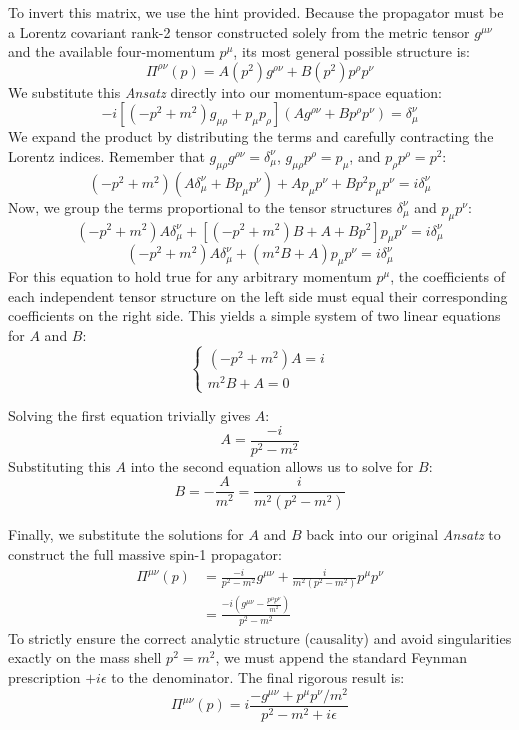 To invert this matrix, we use the hint provided. Because the propagator must be a Lorentz covariant rank-2 tensor constructed solely from the metric tensor $g^{\mu\nu}$ and the available four-momentum $p^\mu$, its most general possible structure is:
\[
    \Pi^{\rho\nu}(p) = A(p^2) g^{\rho\nu} + B(p^2) p^\rho p^\nu
\]
We substitute this \textit{Ansatz} directly into our momentum-space equation:
\[
    -i \left[ (-p^2 + m^2)g_{\mu\rho} + p_\mu p_\rho \right] \left( A g^{\rho\nu} + B p^\rho p^\nu \right) = \delta_\mu^\nu
\]
We expand the product by distributing the terms and carefully contracting the Lorentz indices. Remember that $g_{\mu\rho} g^{\rho\nu} = \delta_\mu^\nu$, $g_{\mu\rho} p^\rho = p_\mu$, and $p_\rho p^\rho = p^2$:
\[
    (-p^2 + m^2)(A \delta_\mu^\nu + B p_\mu p^\nu) + A p_\mu p^\nu + B p^2 p_\mu p^\nu = i \delta_\mu^\nu
\]
Now, we group the terms proportional to the tensor structures $\delta_\mu^\nu$ and $p_\mu p^\nu$:
\[
    (-p^2 + m^2)A \delta_\mu^\nu + \left[ (-p^2 + m^2)B + A + B p^2 \right] p_\mu p^\nu = i \delta_\mu^\nu
\]
\[
    (-p^2 + m^2)A \delta_\mu^\nu + \left( m^2 B + A \right) p_\mu p^\nu = i \delta_\mu^\nu
\]
For this equation to hold true for any arbitrary momentum $p^\mu$, the coefficients of each independent tensor structure on the left side must equal their corresponding coefficients on the right side. This yields a simple system of two linear equations for $A$ and $B$:
\[
    \begin{cases}
        (-p^2 + m^2)A = i \\
        m^2 B + A = 0
    \end{cases}
\]

Solving the first equation trivially gives $A$:
\[
    A = \frac{-i}{p^2 - m^2}
\]
Substituting this $A$ into the second equation allows us to solve for $B$:
\[
    B = -\frac{A}{m^2} = \frac{i}{m^2 (p^2 - m^2)}
\]

Finally, we substitute the solutions for $A$ and $B$ back into our original \textit{Ansatz} to construct the full massive spin-1 propagator:
\[
    \begin{aligned}
        \Pi^{\mu\nu}(p) & = \frac{-i}{p^2 - m^2} g^{\mu\nu} + \frac{i}{m^2(p^2 - m^2)} p^\mu p^\nu   \\
                        & = \frac{-i \left( g^{\mu\nu} - \frac{p^\mu p^\nu}{m^2} \right)}{p^2 - m^2}
    \end{aligned}
\]
To strictly ensure the correct analytic structure (causality) and avoid singularities exactly on the mass shell $p^2 = m^2$, we must append the standard Feynman prescription $+i\epsilon$ to the denominator. The final rigorous result is:
\[
    \Pi^{\mu\nu}(p) = i \frac{-g^{\mu\nu} + p^\mu p^\nu / m^2}{p^2 - m^2 + i\epsilon}
\]


